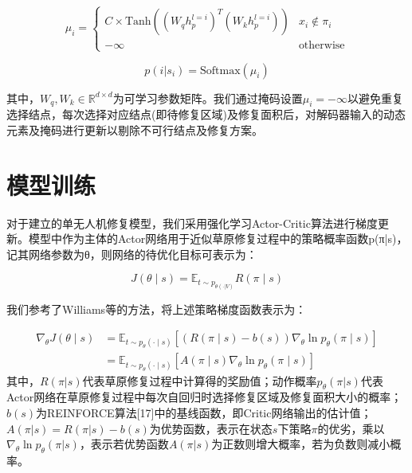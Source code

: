 \documentclass[AutoFakeBold]{LZUThesis}
\begin{document}
\begin{equation}
	\mu_{i} =
	\begin{cases}
		C \times \text{Tanh}\left((W_{q}h_{p}^{l=i})^{T}(W_{k}h_{p}^{l=i})\right) & x_{i} \notin \pi_{i} \\
		-\infty                                                                   & \text{otherwise}
	\end{cases}
	\label{eq:15b}
\end{equation}

\begin{equation}
	p(i|s_{i}) = \text{Softmax}(\mu_{i})
	\label{eq:15c}
\end{equation}

其中，$W_q,W_k\in\mathbb{R}^{d\times d}$为可学习参数矩阵。我们通过掩码设置$\mu_i=-\infty$以避免重复选择结点，每次选择对应结点(即待修复区域)及修复面积后，对解码器输入的动态元素及掩码进行更新以剔除不可行结点及修复方案。

\section{模型训练}
对于建立的单无人机修复模型，我们采用强化学习Actor-Critic算法\cite{sutton1999policy}进行梯度更新。模型中作为主体的Actor网络用于近似草原修复过程中的策略概率函数p(π|s)，记其网络参数为θ，则网络的待优化目标可表示为：

\begin{equation}
	J(\theta \mid s) = \mathbb{E}_{t \sim p_{\theta(\cdot | V)}} R(\pi \mid s)
	\label{eq:16}
\end{equation}

我们参考了Williams等的方法\cite{williams1992simple}，将上述策略梯度函数表示为：

\begin{align}
	\nabla_{\theta}J(\theta \mid s)
	 & = \mathbb{E}_{t \sim p_{\theta}(\cdot \mid s)} \left[(R(\pi \mid s) - b(s)) \nabla_{\theta} \ln p_{\theta}(\pi \mid s)\right] \label{eq:17a} \\
	 & = \mathbb{E}_{t \sim p_{\theta}(\cdot \mid s)} \left[A(\pi \mid s) \nabla_{\theta} \ln p_{\theta}(\pi \mid s)\right] \label{eq:17b}
\end{align}
其中，$R(\pi|s)$代表草原修复过程中计算得的奖励值；动作概率$p_\theta(\pi|s)$代表Actor网络在草原修复过程中每次自回归时选择修复区域及修复面积大小的概率；$b(s)$为REINFORCE算法[17]中的基线函数，即Critic网络输出的估计值；$A(\pi|s)=R(\pi|s)-b(s)$为优势函数，表示在状态$s$下策略$\pi$的优劣，乘以$\nabla_\theta\ln p_\theta(\pi|s)$，表示若优势函数$A(\pi|s)$为正数则增大概率，若为负数则减小概率。
\end{document}
